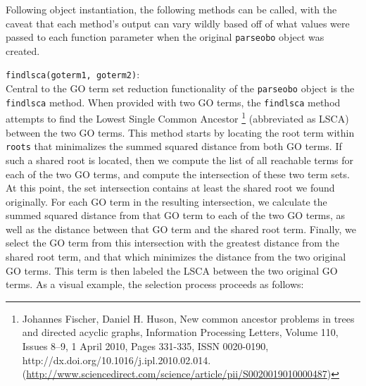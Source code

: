 \documentclass[10pt,a4paper,notitlepage]{article}
\newcommand\ttscore[0]{\underline{\hspace{0.2cm}}}
\begin{document}
Following object instantiation, the following methods can be called, with the caveat that each method's output can vary wildly based off of what values were passed to each function parameter when the original \texttt{parse\ttscore obo} object was created.

\texttt{find\ttscore lsca(go\ttscore term1, go\ttscore term2)}:\\
Central to the GO term set reduction functionality of the \texttt{parse\ttscore obo} object is the \texttt{find\ttscore lsca} method. When provided with two GO terms, the \texttt{find\ttscore lsca} method attempts to find the Lowest Single Common Ancestor \footnote{Johannes Fischer, Daniel H. Huson, New common ancestor problems in trees and directed acyclic graphs, Information Processing Letters, Volume 110, Issues 8–9, 1 April 2010, Pages 331-335, ISSN 0020-0190, http://dx.doi.org/10.1016/j.ipl.2010.02.014.
(\url{http://www.sciencedirect.com/science/article/pii/S0020019010000487})} (abbreviated as LSCA) between the two GO terms. This method starts by locating the root term within \texttt{roots} that minimalizes the summed squared distance from both GO terms. If such a shared root is located, then we compute the list of all reachable terms for each of the two GO terms, and compute the intersection of these two term sets. At this point, the set intersection contains at least the shared root we found originally. For each GO term in the resulting intersection, we calculate the summed squared distance from that GO term to each of the two GO terms, as well as the distance between that GO term and the shared root term. Finally, we select the GO term from this intersection with the greatest distance from the shared root term, and that which minimizes the distance from the two original GO terms. This term is then labeled the LSCA between the two original GO terms. As a visual example, the selection process proceeds as follows:
\end{document}
